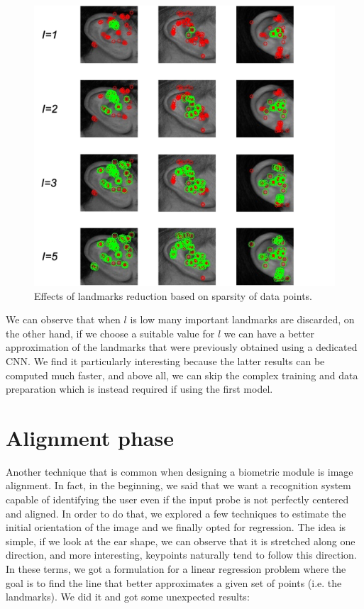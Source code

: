 \documentclass{article}
\begin{document}
\begin{figure}[h]
    \label{fig:landmark_orb_reduced}
    \begin{center}
        \includegraphics[width=14cm,keepaspectratio]{images/landmark_orb_reduced.png}
        \caption{Effects of landmarks reduction based on sparsity of data points.}
    \end{center}
\end{figure}

We can observe that when $l$ is low many important landmarks are discarded, on the other hand,
if we choose a suitable value for $l$ we can have a better approximation of the landmarks that were previously
obtained using a dedicated CNN. We find it particularly interesting because the latter results can be computed
much faster, and above all, we can skip the complex training and data preparation which is instead required if
using the first model.

\section{Alignment phase}

Another technique that is common when designing a biometric module is image alignment. In fact,
in the beginning, we said that we want a recognition system capable of identifying the user even if the
input probe is not perfectly centered and aligned. In order to do that, we explored a few techniques to
estimate the initial orientation of the image and we finally opted for regression. The idea is simple, if
we look at the ear shape, we can observe that it is stretched along one direction, and more interesting,
keypoints naturally tend to follow this direction. In these terms, we got a formulation for a linear
regression problem where the goal is to find the line that better approximates a given set of points
(i.e. the landmarks). We did it and got some unexpected results:
\end{document}
